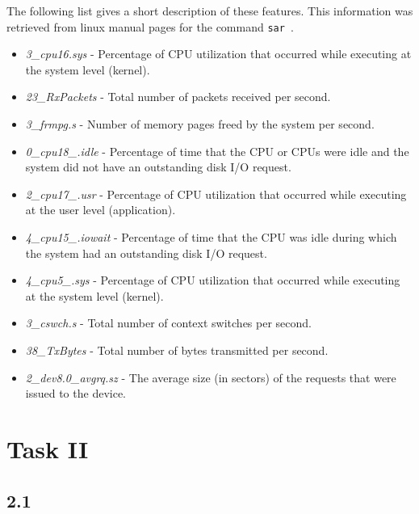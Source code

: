 \documentclass[10pt]{article}
\begin{document}
The following list gives a short description of these features. This information was retrieved from linux manual pages for the command \texttt{sar}~\cite{sar}.

\begin{itemize}
    \item \textit{3\_cpu16.sys} - Percentage of CPU utilization that occurred while executing at the system level (kernel).
    \item \textit{23\_RxPackets} - Total number of packets received per second.
    \item \textit{3\_frmpg.s} - Number of memory pages freed by the system per second.
    \item \textit{0\_cpu18\_.idle} - Percentage of time that the CPU or CPUs were idle and the system did not have an outstanding disk I/O request.
    \item \textit{2\_cpu17\_.usr} - Percentage of CPU utilization that occurred while executing at the user level (application).
    \item \textit{4\_cpu15\_.iowait} - Percentage of time that the CPU was idle during which the system had an outstanding disk I/O request.
    \item \textit{4\_cpu5\_.sys} - Percentage of CPU utilization that occurred while executing at the system level (kernel).
    \item \textit{3\_cswch.s} - Total number of context switches per second.
    \item \textit{38\_TxBytes} - Total number of bytes transmitted per second.
    \item \textit{2\_dev8.0\_avgrq.sz} - The average size (in sectors) of the requests that were issued to the device.
\end{itemize}

\section*{Task II}
\label{sec:4}

\subsection*{2.1}
\label{sec:5}
\end{document}
